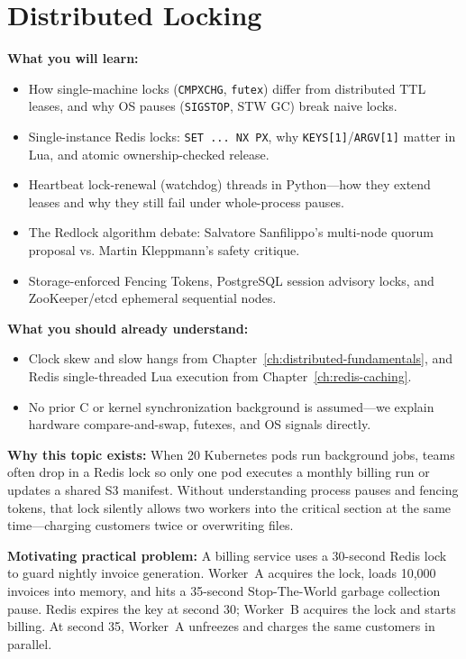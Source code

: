 \chapter{Distributed Locking}
\label{ch:distributed-locking}

\begin{chaptergoalsbox}
\textbf{What you will learn:}
\begin{itemize}[leftmargin=12pt]
  \item How single-machine locks (\texttt{CMPXCHG}, \texttt{futex}) differ from distributed TTL leases, and why OS pauses (\texttt{SIGSTOP}, STW GC) break naive locks.
  \item Single-instance Redis locks: \texttt{SET ... NX PX}, why \texttt{KEYS[1]}/\texttt{ARGV[1]} matter in Lua, and atomic ownership-checked release.
  \item Heartbeat lock-renewal (watchdog) threads in Python---how they extend leases and why they still fail under whole-process pauses.
  \item The Redlock algorithm debate: Salvatore Sanfilippo's multi-node quorum proposal vs. Martin Kleppmann's safety critique.
  \item Storage-enforced Fencing Tokens, PostgreSQL session advisory locks, and ZooKeeper/etcd ephemeral sequential nodes.
\end{itemize}

\textbf{What you should already understand:}
\begin{itemize}[leftmargin=12pt]
  \item Clock skew and slow hangs from Chapter~\ref{ch:distributed-fundamentals}, and Redis single-threaded Lua execution from Chapter~\ref{ch:redis-caching}.
  \item No prior C or kernel synchronization background is assumed---we explain hardware compare-and-swap, futexes, and OS signals directly.
\end{itemize}

\textbf{Why this topic exists:}
When 20 Kubernetes pods run background jobs, teams often drop in a Redis lock so only one pod executes a monthly billing run or updates a shared S3 manifest. Without understanding process pauses and fencing tokens, that lock silently allows two workers into the critical section at the same time---charging customers twice or overwriting files.

\textbf{Motivating practical problem:}
A billing service uses a 30-second Redis lock to guard nightly invoice generation. Worker~A acquires the lock, loads 10,000 invoices into memory, and hits a 35-second Stop-The-World garbage collection pause. Redis expires the key at second 30; Worker~B acquires the lock and starts billing. At second 35, Worker~A unfreezes and charges the same customers in parallel.
\end{chaptergoalsbox}

